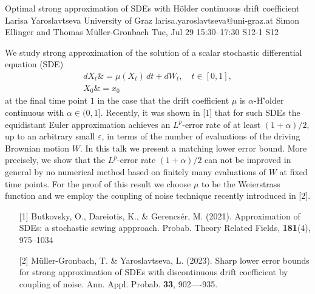 \begin{talk}
  {Optimal strong approximation of SDEs with H\"older continuous drift coefficient}%
  {Larisa Yaroslavtseva}%
  {University of Graz}%
  {larisa.yaroslavtseva@uni-graz.at}%
  {Simon Ellinger and Thomas Müller-Gronbach}%
  {}%
  {Tue, Jul 29 15:30–17:30}%
  {S12-1}%
  {S12}%
  
				
			
We study strong approximation of the solution of a scalar stochastic differential equation (SDE)
\begin{equation}\label{sde0}
	\begin{aligned}
		dX_t \& = \mu(X_t) \, dt +  dW_t, \quad t\in [0,1],\\
		X_0 \& = x_0
	\end{aligned}
\end{equation}
at the final time point $1$
in the case that  the drift coefficient  $\mu$ is $\alpha$-H\''older continuous with $\alpha\in(0, 1]$.
Recently, it was  shown in [1] that for such SDEs the equidistant Euler approximation achieves an $L^p$-error rate of at least $(1+\alpha)/2$, up to an arbitrary small $\varepsilon$,
in terms of the number of evaluations of the driving Brownian motion $W$.
In this talk  we  
present a matching  lower error bound.   More precisely, we show that
the $L^p$-error rate $(1+\alpha)/2$ can
not be improved in general by  no numerical 
method based on finitely many evaluations of $W$ at fixed time points. For the proof of this result we choose  $\mu$ to be the Weierstrass function and we employ  the coupling of noise technique  recently introduced in [2].




\begin{enumerate}
	\item[{[1]}] Butkovsky, O., Dareiotis, K., \& Gerencs\'er, M. (2021). Approximation of SDEs: a stochastic sewing appproach. Probab. Theory Related Fields, \textbf{181}(4), 975--1034
	\item[{[2]}] Müller-Gronbach, T.  \& Yaroslavtseva, L. (2023). Sharp lower error bounds for strong approximation of
	SDEs with discontinuous drift coefficient by coupling of noise. Ann. Appl. Probab. \textbf{33}, 902----935.
\end{enumerate}


\end{talk}

